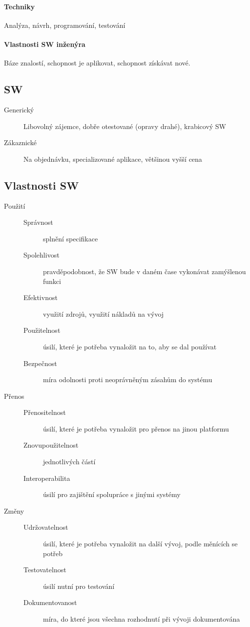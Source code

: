 \documentclass[a4paper, 11pt]{report}
\begin{document}
\paragraph{Techniky} Analýza, návrh, programování, testování

\paragraph{Vlastnosti SW inženýra} Báze znalostí, schopnost je aplikovat, schopnost získávat nové.

\subsection{SW}
\begin{description}
	\item[Generický] Libovolný zájemce, dobře otestované (opravy drahé), krabicový SW
	\item[Zákaznické] Na objednávku, specializované aplikace, většinou vyšší cena
\end{description}

\subsection{Vlastnosti SW}
\begin{description}
	\item[Použití] \hfill
	\begin{description}
		\item[Správnost] splnění specifikace
		\item[Spolehlivost] pravděpodobnost, že SW bude v daném čase vykonávat zamýšlenou funkci
		\item[Efektivnost] využití zdrojů, využití nákladů na vývoj
		\item[Použitelnost] úsilí, které je potřeba vynaložit na to, aby se dal používat
		\item[Bezpečnost] míra odolnosti proti neoprávněným zásahům do systému
	\end{description}
	\item[Přenos] \hfill
	\begin{description}
		\item[Přenositelnost] úsilí, které je potřeba vynaložit pro přenos na jinou platformu
		\item[Znovupoužitelnost] jednotlivých částí
		\item[Interoperabilita] úsilí pro zajištění spolupráce s jinými systémy
	\end{description}
	\item[Změny] \hfill
	\begin{description}
		\item[Udržovatelnost] úsilí, které je potřeba vynaložit na další vývoj, podle měnících se potřeb
		\item[Testovatelnost] úsilí nutní pro testování
		\item[Dokumentovanost] míra, do které jsou všechna rozhodnutí při vývoji dokumentována
	\end{description}
\end{description}
\end{document}

